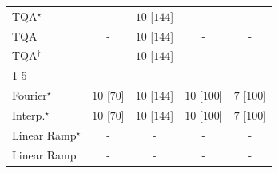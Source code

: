 \begin{tabular}{l|cccc|}
TQA$^\star$ & {\cellcolor[HTML]{000000}} \color[HTML]{F1F1F1} {\cellcolor{white}} \color{black} - & {\cellcolor[HTML]{00441B}} \color[HTML]{F1F1F1} $10$ [$144$] & {\cellcolor[HTML]{000000}} \color[HTML]{F1F1F1} {\cellcolor{white}} \color{black} - & {\cellcolor[HTML]{000000}} \color[HTML]{F1F1F1} {\cellcolor{white}} \color{black} - \\
TQA & {\cellcolor[HTML]{000000}} \color[HTML]{F1F1F1} {\cellcolor{white}} \color{black} - & {\cellcolor[HTML]{00441B}} \color[HTML]{F1F1F1} $10$ [$144$] & {\cellcolor[HTML]{000000}} \color[HTML]{F1F1F1} {\cellcolor{white}} \color{black} - & {\cellcolor[HTML]{000000}} \color[HTML]{F1F1F1} {\cellcolor{white}} \color{black} - \\
TQA$^\dagger$ & {\cellcolor[HTML]{000000}} \color[HTML]{F1F1F1} {\cellcolor{white}} \color{black} - & {\cellcolor[HTML]{00441B}} \color[HTML]{F1F1F1} $10$ [$144$] & {\cellcolor[HTML]{000000}} \color[HTML]{F1F1F1} {\cellcolor{white}} \color{black} - & {\cellcolor[HTML]{000000}} \color[HTML]{F1F1F1} {\cellcolor{white}} \color{black} - \\
\cline{1-5}
\multicolumn{5}{c}{\rule{0pt}{8pt}PP} \\
\midrule
Fourier$^\star$ & {\cellcolor[HTML]{00441B}} \color[HTML]{F1F1F1} $10$ [$70$] & {\cellcolor[HTML]{00441B}} \color[HTML]{F1F1F1} $10$ [$144$] & {\cellcolor[HTML]{00441B}} \color[HTML]{F1F1F1} $10$ [$100$] & {\cellcolor[HTML]{37A055}} \color[HTML]{F1F1F1} $7$ [$100$] \\
Interp.$^\star$ & {\cellcolor[HTML]{00441B}} \color[HTML]{F1F1F1} $10$ [$70$] & {\cellcolor[HTML]{00441B}} \color[HTML]{F1F1F1} $10$ [$144$] & {\cellcolor[HTML]{00441B}} \color[HTML]{F1F1F1} $10$ [$100$] & {\cellcolor[HTML]{37A055}} \color[HTML]{F1F1F1} $7$ [$100$] \\
Linear Ramp$^\star$ & {\cellcolor[HTML]{000000}} \color[HTML]{F1F1F1} {\cellcolor{white}} \color{black} - & {\cellcolor[HTML]{000000}} \color[HTML]{F1F1F1} {\cellcolor{white}} \color{black} - & {\cellcolor[HTML]{000000}} \color[HTML]{F1F1F1} {\cellcolor{white}} \color{black} - & {\cellcolor[HTML]{000000}} \color[HTML]{F1F1F1} {\cellcolor{white}} \color{black} - \\
Linear Ramp & {\cellcolor[HTML]{000000}} \color[HTML]{F1F1F1} {\cellcolor{white}} \color{black} - & {\cellcolor[HTML]{000000}} \color[HTML]{F1F1F1} {\cellcolor{white}} \color{black} - & {\cellcolor[HTML]{000000}} \color[HTML]{F1F1F1} {\cellcolor{white}} \color{black} - & {\cellcolor[HTML]{000000}} \color[HTML]{F1F1F1} {\cellcolor{white}} \color{black} - \\

\end{tabular}
